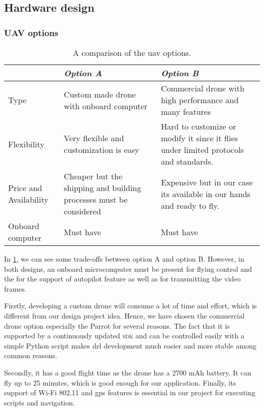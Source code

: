 \documentclass[../main.tex]{subfiles}
\begin{document}
\subsection{Hardware design}

\subsubsection{UAV options}
\begin{table}[H]
	\centering
	\caption{A comparison of the \gls{uav} options.}
	\label{tab:alt-solutions}
	\begin{tabularx}{\textwidth}{ p{4cm} X X }
		\toprule
		\textit{} & \textit{Option A} & \textit{Option B}\\ \midrule
		Type  & Custom made drone with onboard computer & 
		Commercial drone with high performance and many features    \\
		Flexibility & Very flexible and customization is easy & 
		Hard to customize or modify it since it flies under 
		limited protocols and standards. \\
		
		Price and Availability & Cheaper but the shipping and 
		building processes must be considered & Expensive but 
		in our case its available in our hands and ready to fly.   \\
		
		Onboard computer & Must have & Must have \\
		\bottomrule
	\end{tabularx}
\end{table} 

In \cref{tab:alt-solutions}, 
we can see some trade-offs 
between option A and option B. However, in both designs, 
an onboard microcomputer must be present for 
flying control and the for the support of autopilot feature as well as for 
transmitting the video frames. 


Firstly, developing a custom drone will consume a lot of time and effort, 
which is different from our design project idea.
Hence, we have chosen the commercial drone option especially 
the Parrot \anafi for several reasons.
The fact that it is supported by a continuously updated 
\textsc{sdk} and can be controlled easily 
with a simple Python script makes 
\gls{drl} development much easier and more stable among common reasons.

Secondly, it has a good flight time 
as the \anafi drone has a 2700 mAh battery. 
It can fly up to 25 minutes, which is good enough 
for our application.
Finally, its support of Wi-Fi 802.11 and \gls{gps} 
features is essential in our project for 
executing scripts and navigation.
\end{document}
